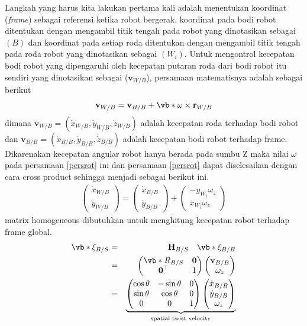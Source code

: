 Langkah yang harus kita lakukan pertama kali adalah menentukan koordinat (\textit{frame}) sebagai referensi ketika robot bergerak. koordinat pada bodi robot ditentukan dengan mengambil titik tengah pada robot yang dinotasikan sebagai $(B)$ dan koordinat pada setiap roda ditentukan dengan mengambil titik tengah pada roda robot yang dinotasikan sebagai $(W_i)$. Untuk mengontrol kecepatan bodi robot yang dipengaruhi oleh kecepatan putaran roda dari bodi robot itu sendiri yang dinotasikan sebagai ($\mathbf{v}_{W/B}$), persamaan matematisnya adalah sebagai berikut
    \begin{eqnarray}
        \mathbf{v}_{W/B} = \mathbf{v}_{B/B} + \vb*{\omega} \times \mathbf{r}_{W/B}\label{persrot}
    \end{eqnarray}
dimana $\mathbf{v}_{W/B} = (\dot{x}_{W/B},\dot{y}_{W/B},\dot{z}_{W/B})$ adalah kecepatan roda terhadap bodi robot dan $\mathbf{v}_{B/B} = (\dot{x}_{B/B},\dot{y}_{B/B},\dot{z}_{B/B})$ adalah kecepatan bodi robot terhadap frame\cite{luan19}. Dikarenakan kecepatan angular robot hanya berada pada sumbu Z maka nilai $\omega$ pada persamaan \eqref{persrot} ini dan persamaan \eqref{persrot} dapat diselesaikan dengan cara cross product sehingga menjadi sebagai berikut ini. 
    \begin{eqnarray}
            \begin{pmatrix} \dot{x}_{W/B}\\\dot{y}_{W/B} \end{pmatrix}
            = \begin{pmatrix} \dot{x}_{B/B}\\\dot{y}_{B/B}\end{pmatrix} + \begin{pmatrix} -y_{W_i}\omega_z\\ x_{W_i} \omega_z\end{pmatrix}
    \end{eqnarray}
matrix homogeneous dibutuhkan untuk menghitung kecepatan robot terhadap frame global. 
\begin{eqnarray}
            \vb*{\xi}_{B/S} &=& \mathbf{H}_{B/S} \quad \vb*{\xi}_{B/B}\\
            &=& \begin{pmatrix} \vb*{R}_{B/S} & \mathbf{0}\\ \mathbf{0^\top} & 1\end{pmatrix}\begin{pmatrix} \mathbf{v}_{B/B}\\\omega_{z}\end{pmatrix}\\
            &=& \underbrace{\begin{pmatrix}\cos{\theta} & -\sin{\theta} & 0 \\ \sin{\theta} & \cos{\theta} & 0 \\ 0& 0 & 1\end{pmatrix}\begin{pmatrix}\dot{x}_{B/B}\\\dot{y}_{B/B}\\\omega_{z}\end{pmatrix}}_\text{spatial twist velocity}
            \label{forward}
        \end{eqnarray}
